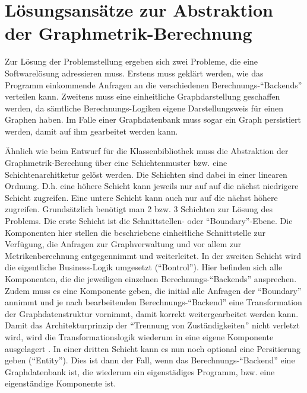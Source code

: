 \documentclass[a4paper,12pt,ngerman,chapterprefix=false,listof=totoc,bibliography=totoc]{scrreprt}
\begin{document}
{{\section{Lösungsansätze zur Abstraktion der Graphmetrik-Berechnung}
{
Zur Lösung der Problemstellung ergeben sich zwei Probleme, die eine Softwarelösung adressieren muss. Erstens muss geklärt werden, wie das Programm einkommende Anfragen an die verschiedenen Berechnungs-"`Backends"' verteilen kann. Zweitens muss eine einheitliche Graphdarstellung geschaffen werden, da sämtliche Berechnungs-Logiken eigene Darstellungsweis für einen Graphen haben. Im Falle einer Graphdatenbank muss sogar ein Graph persistiert werden, damit auf ihm gearbeitet werden kann.

Ähnlich wie beim Entwurf für die Klassenbibliothek muss die Abstraktion der Graphmetrik-Berechung über eine Schichtenmuster bzw. eine Schichtenarchitketur gelöst werden. Die Schichten sind dabei in einer linearen Ordnung. D.h. eine höhere Schicht kann jeweils nur auf auf die nächst niedrigere Schicht zugreifen. \cite{balzert_lehrbuch_2011} Eine untere Schicht kann auch nur auf die nächst höhere zugreifen. Grundsätzlich benötigt man 2 bzw. 3 Schichten zur Lösung des Problems. Die erste Schicht ist die Schnittstellen- oder "`Boundary"'-Ebene. Die Komponenten hier stellen die beschriebene einheitliche Schnittstelle zur Verfügung, die Anfragen zur Graphverwaltung und vor allem zur Metrikenberechnung entgegennimmt und weiterleitet. In der zweiten Schicht wird die eigentliche Business-Logik umgesetzt ("`Bontrol"'). Hier befinden sich alle Komponenten, die die jeweiligen einzelnen Berechnungs-"`Backends"' ansprechen. Zudem muss es eine Komponente geben, die initial alle Anfragen der "`Boundary"' annimmt und je nach bearbeitenden Berechnungs-"`Backend"' eine Transformation der Graphdatenstruktur vornimmt, damit korrekt weitergearbeitet werden kann. Damit das Architekturprinzip der "`Trennung von Zuständigkeiten"' nicht verletzt wird, wird die Transformationslogik wiederum in eine eigene Komponente ausgelagert \cite{balzert_lehrbuch_2011}. In einer dritten Schicht kann es nun noch optional eine Persitierung geben ("`Entity"'). Dies ist dann der Fall, wenn das Berechnungs-"`Backend"' eine Graphdatenbank ist, die wiederum ein eigenstädiges Programm, bzw. eine eigenständige Komponente ist.

}}}
\end{document}
